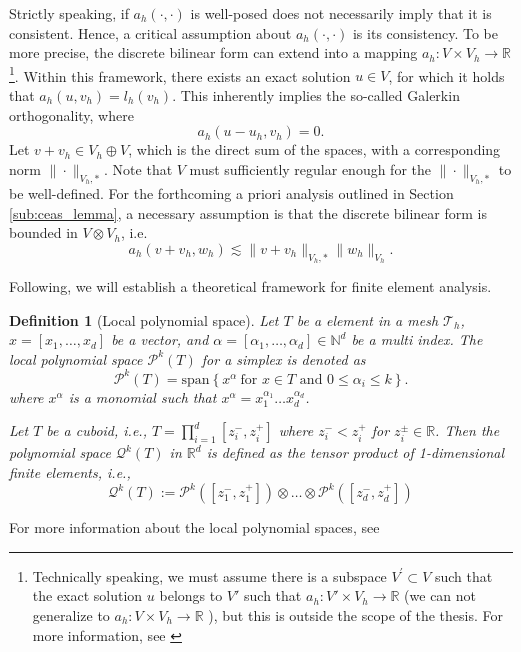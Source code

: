 \documentclass[11pt]{article}
\newtheorem{definition}[theorem]{Definition}
\theoremstyle{remark}
\renewcommand{\le}{\leqslant}
\numberwithin{equation}{section}
\begin{document}
Strictly speaking, if $a_{h}( \cdot ,\cdot ) $ is well-posed does not necessarily imply that it is consistent. Hence, a critical assumption about $a_{h}( \cdot ,\cdot )$ is its consistency. To be more precise, the discrete bilinear form can extend into a mapping $a_{h} : V \times V_{h} \to \mathbb{R}$
\footnote{
Technically speaking, we must assume there is a subspace $V^{'} \subset V$  such that the exact solution $u$  belongs to $ V'  $ such that $a_{h}: V' \times V_{h} \to \mathbb{R} $ (we can not generalize to $a_{h} : V \times
V_{h} \to \mathbb{R} $ ), but this is outside the scope of the thesis. For more information, see \cite[Definition 1.31]{pietro2012}}. Within this framework, there exists an exact solution $u \in V$, for which it holds that $a_{h}( u,v_{h}) = l_{h}( v_{h})$. This inherently implies the so-called Galerkin orthogonality, where
\begin{equation}
    \label{eq:galerin_orth}
a_{h}( u - u_{h}, v_{h}) = 0.
\end{equation}
Let $v + v_{h} \in V_{h} \oplus V$, which is the direct sum of the spaces, with a corresponding norm $\| \cdot  \|_{V_{h},*  }^{  } $. Note that $V$ must sufficiently regular enough for the $\| \cdot  \|_{V_{h},*  }^{  } $ to be well-defined. For the forthcoming a priori analysis outlined in Section \ref{sub:ceas_lemma}, a necessary assumption is that the discrete bilinear form is bounded in $V \otimes V_{h}$, i.e.
\begin{equation}
    \label{eq:ah_star}
a_{h}( v + v_{h}, w_{h}) \lesssim  \| v + v_{h} \|_{ V_{h},* }^{  } \| w_{h} \|_{V_{h}  }^{  }.
\end{equation}


Following, we will establish a theoretical framework for finite element analysis.
\begin{definition}[Local polynomial space]
    \label{def:local_space}
    Let $T$ be a element in a mesh $\mathcal{T}_{h} $,  $x = \left[ x_{1}, \ldots, x_{d} \right] $ be a vector, and $\alpha  = \left[ \alpha _{1}, \ldots, \alpha _{d} \right] \in \mathbb{N} ^{d} $ be a multi index.
    The local polynomial space $\mathcal{P} ^{k}( T) $ for a simplex is denoted as
    \begin{equation}
    \label{eq:pol_space}
        \mathcal{P}^{k}( T) =  \mathrm{span}\left\{ x^{\alpha } \ \text{for } x \in T \text{ and } 0 \le  \alpha _{i} \le k \right\}.
    \end{equation}
    where  $x^{\alpha }$ is a monomial such that $x^{\alpha } = x_{1}^{\alpha _{1}} \ldots x_{d}^{\alpha _{d}}$.

    Let $T$ be a cuboid, i.e.,  $T = \prod_{i=1}^{d} [z_{i}^{-},z_{i}^{+}]$ where $z_{i}^{-}< z_{i}^{+}$ for $z_{i}^{\pm} \in \mathbb{R} $. Then the polynomial space $\mathcal{Q}^{k}( T)$  in $\mathbb{R} ^{d}$ is defined as the tensor product of 1-dimensional
    finite elements, i.e.,
      \[
    \mathcal{Q} ^{k}(T)  := \mathcal{P}^{k}( [z_{1}^{-},z_{1}^{+}] ) \otimes \ldots \otimes \mathcal{P}^{k}( [z_{d}^{-},z_{d}^{+}] )
    \]
\end{definition}
For more information about the local polynomial spaces, see \cite[Chapter 6.4, 7.3]{ErnGuermond2021}
\end{document}
